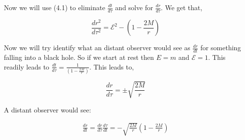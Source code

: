 \documentclass[10pt]{article}
\begin{document}
Now we will use (4.1) to eliminate $\frac{dt}{d\tau}$ and solve for $\frac{dr}{d\tau}$. We get that, 

\begin{equation}
\frac{dr^2}{d\tau^2} = \mathcal{E}^2 - (1-\frac{2M}{r})
\end{equation}

Now we will try identify what an distant observer would see as $\frac{dr}{dt}$ for something falling into a black hole. So if we start at rest then $ E = m$ and $ \mathcal{E} =1$. This readily leads to $\frac{dt}{d\tau} = \frac{1}{(1- \frac{2M}{r})}$.  This leads to, 

\begin{equation}
\frac{dr}{d\tau} = \pm \sqrt{\frac{2M}{r}}
\end{equation}

A distant observer would see: 

\begin{equation}
\begin{split} 
\frac{dr}{dt} = \frac{dr}{d\tau}\frac{d\tau}{dt} =-\sqrt{ \frac{2M}{r}}(1 - \frac{2M}{r})
\end{split}
\end{equation}
\end{document}
